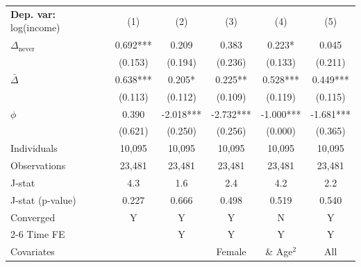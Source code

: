 \begin{tabular}{l ccccc} \toprule  \textbf{Dep. var:}  log(income) 
                    &\multicolumn{1}{c}{(1)}   &\multicolumn{1}{c}{(2)}   &\multicolumn{1}{c}{(3)}   &\multicolumn{1}{c}{(4)}   &\multicolumn{1}{c}{(5)}   \\

\addlinespace
$\Delta_{\text{never}}$&       0.692***&       0.209   &       0.383   &       0.223*  &       0.045   \\
                    &     (0.153)   &     (0.194)   &     (0.236)   &     (0.133)   &     (0.211)   \\

\addlinespace
$\bar{\Delta}$      &       0.638***&       0.205*  &       0.225** &       0.528***&       0.449***\\
                    &     (0.113)   &     (0.112)   &     (0.109)   &     (0.119)   &     (0.115)   \\

\addlinespace
$\phi$              &       0.390   &      -2.018***&      -2.732***&      -1.000***&      -1.681***\\
                    &     (0.621)   &     (0.250)   &     (0.256)   &     (0.000)   &     (0.365)   \\
\addlinespace
Individuals         &      10,095   &      10,095   &      10,095   &      10,095   &      10,095   \\
Observations        &      23,481   &      23,481   &      23,481   &      23,481   &      23,481   \\
J-stat              &         4.3   &         1.6   &         2.4   &         4.2   &         2.2   \\
J-stat (p-value)    &       0.227   &       0.666   &       0.498   &       0.519   &       0.540   \\
Converged           &           Y   &           Y   &           Y   &           N   &           Y   \\
\cmidrule{2-6} Time FE & & Y & Y & Y & Y \\ Covariates & & & Female & \& Age$^2$ & All \\ \bottomrule \end{tabular}
